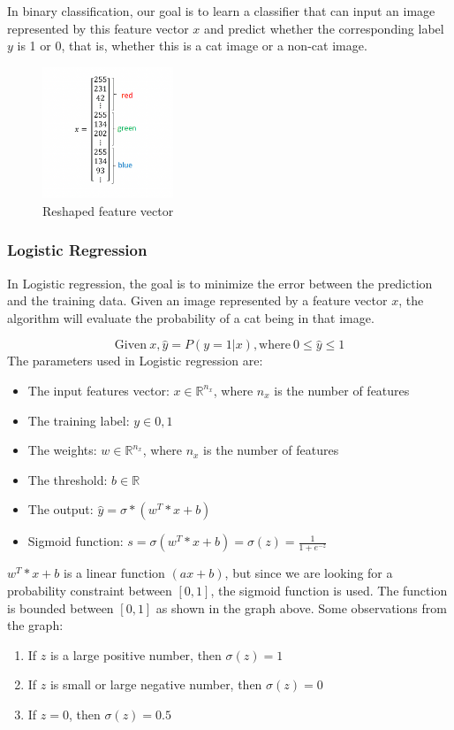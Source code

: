 \documentclass[letterpaper,12pt,notitlepage,twoside]{report}
\begin{document}
\begin{example}
     In binary classification, our goal is to learn a classifier that can input an image represented by this feature vector $x$ and predict whether the corresponding label $y$ is 1 or 0, that is, whether this is a cat image or a non-cat image. 
\end{example}

\begin{figure}[h]
	\centering
	\includegraphics[width=0.35\textwidth]{Images/Reshaped feature vector.png}
	\caption{Reshaped feature vector}
	\label{fig:6}
\end{figure}
\FloatBarrier

\subsubsection{Logistic Regression}
In Logistic regression, the goal is to minimize the error between the prediction and the training data. Given an image represented by a feature vector $x$, the algorithm will evaluate the probability of a cat being in that image.

\begin{equation}
\text{Given}~ x , \hat{y} = P(y=1|x), \text{where}~0 \leq \hat{y} \leq 1
\end{equation}
The parameters used in Logistic regression are:
\begin{itemize}[nosep]
\item The input features vector: $x \in \mathbb{R}^{n_x}$, where $n_x$ is the number of features
\item The training label: $y \in 0,1$
\item The weights: $w \in \mathbb{R}^{n_x}$, where $n_x$ is the number of features
\item The threshold: $b \in \mathbb{R}$
\item The output: $\hat{y} = \sigma*(w^T*x+b)$
\item Sigmoid function: $s = \sigma(w^T*x+b) = \sigma(z)= \frac{1}{1+e^{-z}}$
\end{itemize}
$w^T*x+b$ is a linear function $(ax+b)$, but since we are looking for a probability constraint between $[0,1]$, the sigmoid function is used. The function is bounded between $[0,1]$ as shown in the graph above.
Some observations from the graph:
\begin{enumerate}[nosep]
\item If $z$ is a large positive number, then $\sigma(z) = 1$
\item If $z$ is small or large negative number, then $\sigma(z) = 0$
\item If $z=0$, then $\sigma(z) = 0.5$
\end{enumerate}
\end{document}
